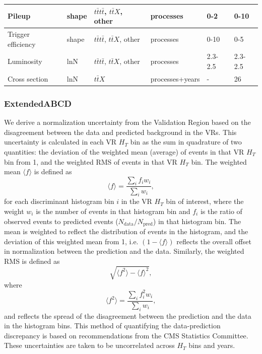 \documentclass[twoside]{article}
\begin{document}
\begin{table}[h!]
{\begin{tabular}{|l|l|l|l|l|l|}
Pileup & shape & $t\bar{t}t\bar{t}$, $t\bar{t}X$, other & processes & 0-2 & 0-10 \\ \hline
Trigger efficiency & shape & $t\bar{t}t\bar{t}$, $t\bar{t}X$, other & processes & 0-10 & 0-5 \\ \hline
Luminosity & lnN & $t\bar{t}t\bar{t}$, $t\bar{t}X$, other & processes & 2.3-2.5 & 2.3-2.5 \\ \hline
Cross section & lnN & $t\bar{t}X$ & processes+years & - & 26 \\ \hline
\end{tabular}
}
\end{table}

\subsubsection{ExtendedABCD}
\label{sec:systextendedabcd}
We derive a normalization uncertainty from the Validation Region based on the disagreement between the data and predicted background in the VRs. This uncertainty is calculated in each VR $H_T$ bin as the sum in quadrature of two quantities: the deviation of the weighted mean (average) of events in that VR $H_T$ bin from 1, and the weighted RMS of events in that VR $H_T$ bin. The weighted mean $\langle f \rangle$ is defined as 
\[
\langle f \rangle = \frac{\sum_i f_i w_i}{\sum_i w_i},
\]
for each discriminant histogram bin $i$ in the VR $H_T$ bin of interest, where the weight $w_i$ is the number of events in that histogram bin and $f_i$ is the ratio of observed events to predicted events ($N_{\text{data}} / N_{\text{pred}}$) in that histogram bin. The mean is weighted to reflect the distribution of events in the histogram, and the deviation of this weighted mean from 1, i.e. $(1 - \langle f \rangle)$ reflects the overall offset in normalization between the prediction and the data. Similarly, the weighted RMS is defined as 
\[
\sqrt{\langle f^2 \rangle - \langle f \rangle^2},
\]
where
\[
\langle f^2 \rangle = \frac{\sum_i f^2_i w_i}{\sum_i w_i},
\]
and reflects the spread of the disagreement between the prediction and the data in the histogram bins. This method of quantifying the data-prediction discrepancy is based on recommendations from the CMS Statistics Committee. These uncertainties are taken to be uncorrelated across $H_T$ bins and years.
\end{document}
